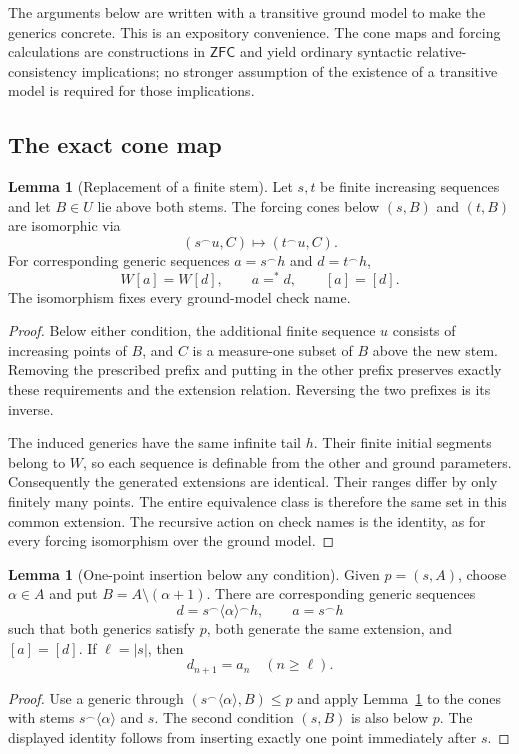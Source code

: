 \documentclass[11pt,letterpaper]{article}
\theoremstyle{definition}
\newtheorem{lemma}[definition]{Lemma}
\numberwithin{equation}{section}
\newcommand{\ZFC}{\mathsf{ZFC}}
\newcommand{\conc}{\mathbin{{}^\frown}}
\begin{document}
The arguments below are written with a transitive ground model to make the generics concrete. This is an expository convenience. The cone maps and forcing calculations are constructions in $\ZFC$ and yield ordinary syntactic relative-consistency implications; no stronger assumption of the existence of a transitive model is required for those implications.

\subsection{The exact cone map}

\begin{lemma}[Replacement of a finite stem]\label{lem:cone}
Let $s,t$ be finite increasing sequences and let $B\in U$ lie above both stems. The forcing cones below $(s,B)$ and $(t,B)$ are isomorphic via
\[
 (s\conc u,C)\longmapsto(t\conc u,C).
\]
For corresponding generic sequences $a=s\conc h$ and $d=t\conc h$,
\[
 W[a]=W[d],\qquad a=^*d,\qquad [a]=[d].
\]
The isomorphism fixes every ground-model check name.
\end{lemma}
\begin{proof}
Below either condition, the additional finite sequence $u$ consists of increasing points of $B$, and $C$ is a measure-one subset of $B$ above the new stem. Removing the prescribed prefix and putting in the other prefix preserves exactly these requirements and the extension relation. Reversing the two prefixes is its inverse.

The induced generics have the same infinite tail $h$. Their finite initial segments belong to $W$, so each sequence is definable from the other and ground parameters. Consequently the generated extensions are identical. Their ranges differ by only finitely many points. The entire equivalence class is therefore the same set in this common extension. The recursive action on check names is the identity, as for every forcing isomorphism over the ground model.
\end{proof}

\begin{lemma}[One-point insertion below any condition]\label{lem:insertion}
Given $p=(s,A)$, choose $\alpha\in A$ and put $B=A\setminus(\alpha+1)$. There are corresponding generic sequences
\[
 d=s\conc\langle\alpha\rangle\conc h,
 \qquad a=s\conc h
\]
such that both generics satisfy $p$, both generate the same extension, and $[a]=[d]$. If $\ell=|s|$, then
\[
 d_{n+1}=a_n\quad(n\geq\ell).
\]
\end{lemma}
\begin{proof}
Use a generic through $(s\conc\langle\alpha\rangle,B)\leq p$ and apply Lemma~\ref{lem:cone} to the cones with stems $s\conc\langle\alpha\rangle$ and $s$. The second condition $(s,B)$ is also below $p$. The displayed identity follows from inserting exactly one point immediately after $s$.
\end{proof}
\end{document}
